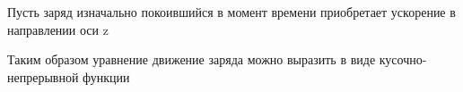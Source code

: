 \documentclass{article}
\begin{document}
\begin{Maple Normal}{
\begin{Maple Normal}{
Пусть заряд изначально покоившийся в момент времени 
приобретает ускорение в направлении оси z}\end{Maple Normal}

}\end{Maple Normal}

\begin{Maple Normal}{
\begin{Maple Normal}{
Таким образом уравнение движение заряда можно выразить в виде кусочно-непрерывной функции}\end{Maple Normal}

}\end{Maple Normal}
\end{document}
